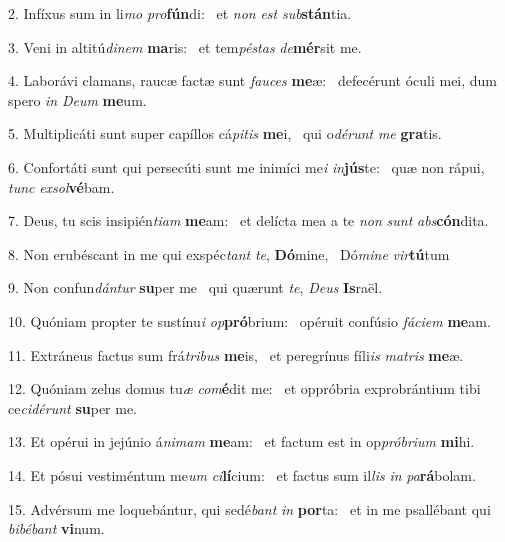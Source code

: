 2. Infíxus sum in li\textit{mo} \textit{pro}\textbf{fún}di: \ast\  et \textit{non} \textit{est} \textit{sub}\textbf{stán}tia.\

3. Veni in altitú\textit{di}\textit{nem} \textbf{ma}ris: \ast\  et tem\textit{pés}\textit{tas} \textit{de}\textbf{mér}sit me.\

4. Laborávi clamans, raucæ factæ sunt \textit{fau}\textit{ces} \textbf{me}æ: \ast\  defecérunt óculi mei, dum spero \textit{in} \textit{De}\textit{um} \textbf{me}um.\

5. Multiplicáti sunt super capíllos cá\textit{pi}\textit{tis} \textbf{me}i, \ast\  qui o\textit{dé}\textit{runt} \textit{me} \textbf{gra}tis.\

6. Confortáti sunt qui persecúti sunt me inimíci me\textit{i} \textit{in}\textbf{jús}te: \ast\  quæ non rápui, \textit{tunc} \textit{ex}\textit{sol}\textbf{vé}bam.\

7. Deus, tu scis insipién\textit{ti}\textit{am} \textbf{me}am: \ast\  et delícta mea a te \textit{non} \textit{sunt} \textit{abs}\textbf{cón}dita.\

8. Non erubéscant in me qui exspéc\textit{tant} \textit{te}, \textbf{Dó}mine, \ast\  Dó\textit{mi}\textit{ne} \textit{vir}\textbf{tú}tum\

9. Non confun\textit{dán}\textit{tur} \textbf{su}per me \ast\  qui quærunt \textit{te}, \textit{De}\textit{us} \textbf{Is}raël.\

10. Quóniam propter te sustínu\textit{i} \textit{op}\textbf{pró}brium: \ast\  opéruit confúsio \textit{fá}\textit{ci}\textit{em} \textbf{me}am.\

11. Extráneus factus sum frá\textit{tri}\textit{bus} \textbf{me}is, \ast\  et peregrínus fíli\textit{is} \textit{ma}\textit{tris} \textbf{me}æ.\

12. Quóniam zelus domus tu\textit{æ} \textit{com}\textbf{é}dit me: \ast\  et oppróbria exprobrántium tibi ce\textit{ci}\textit{dé}\textit{runt} \textbf{su}per me.\

13. Et opérui in jejúnio á\textit{ni}\textit{mam} \textbf{me}am: \ast\  et factum est in op\textit{pró}\textit{bri}\textit{um} \textbf{mi}hi.\

14. Et pósui vestiméntum me\textit{um} \textit{ci}\textbf{lí}cium: \ast\  et factus sum il\textit{lis} \textit{in} \textit{pa}\textbf{rá}bolam.\

15. Advérsum me loquebántur, qui sedé\textit{bant} \textit{in} \textbf{por}ta: \ast\  et in me psallébant qui \textit{bi}\textit{bé}\textit{bant} \textbf{vi}num.\

